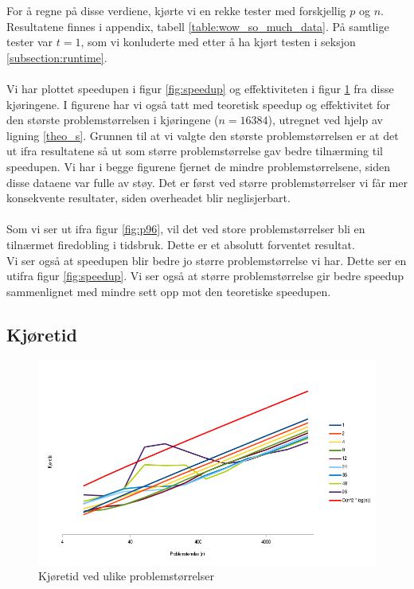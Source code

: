 \documentclass{article}
\begin{document}
For å regne på disse verdiene, kjørte vi en rekke tester med forskjellig $p$ og $n$. Resultatene finnes i appendix, tabell \ref{table:wow_so_much_data}. På samtlige tester var $t=1$, som vi konluderte med etter å ha kjørt testen i seksjon \ref{subsection:runtime}.\\
\\
Vi har plottet speedupen i figur \ref{fig:speedup} og effektiviteten i figur \ref{fig:eff} fra disse kjøringene. I figurene har vi også tatt med teoretisk speedup og effektivitet for den største problemstørrelsen i kjøringene ($n = 16384$), utregnet ved hjelp av ligning \ref{theo_s}. Grunnen til at vi valgte den største problemstørrelsen er at det ut ifra resultatene så ut som større problemstørrelse gav bedre tilnærming til speedupen. Vi har i begge figurene fjernet de mindre problemstørrelsene, siden disse dataene var fulle av støy. Det er først ved større problemstørrelser vi får mer konsekvente resultater, siden overheadet blir neglisjerbart.\\
\\
Som vi ser ut ifra figur \ref{fig:p96}, vil det ved store problemstørrelser bli en tilnærmet firedobling i tidsbruk. Dette er et absolutt forventet resultat. \\

Vi ser også at speedupen blir bedre jo større problemstørrelse vi har. Dette ser en utifra figur \ref{fig:speedup}. Vi ser også at større problemstørrelse gir bedre speedup sammenlignet med mindre sett opp mot den teoretiske speedupen.  

\subsection{Kjøretid}
\begin{figure}[t]
	\centering
	\includegraphics[width=12cm]{img/runtime_n.png}
	\caption{Kjøretid ved ulike problemstørrelser}		
	\label{fig:eff}
\end{figure}
\end{document}
